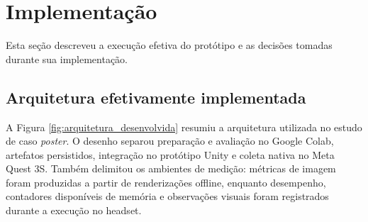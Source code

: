 \section{Implementação}

Esta seção descreveu a execução efetiva do protótipo e as decisões tomadas durante sua implementação.

\subsection{Arquitetura efetivamente implementada}

A Figura \ref{fig:arquitetura_desenvolvida} resumiu a arquitetura utilizada no estudo de caso \textit{poster}. O desenho separou preparação e avaliação no Google Colab, artefatos persistidos, integração no protótipo Unity e coleta nativa no Meta Quest 3S. Também delimitou os ambientes de medição: métricas de imagem foram produzidas a partir de renderizações offline, enquanto desempenho, contadores disponíveis de memória e observações visuais foram registrados durante a execução no headset.


